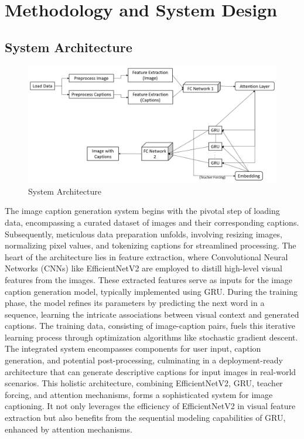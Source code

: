 \documentclass[oneside,a4paper,12pt]{report}
\begin{document}
\chapter{Methodology and System Design}


\section{System Architecture}  
\begin{figure}[H]
\begin{center}
\includegraphics[width=1.0\linewidth]{sysff}
\caption{System Architecture}
\label{Fig:f1}
\end{center}
\end{figure}
The image caption generation system begins with the pivotal step of loading data, encompassing a curated dataset of images and their corresponding captions. Subsequently, meticulous data preparation unfolds, involving resizing images, normalizing pixel values, and tokenizing captions for streamlined processing. The heart of the architecture lies in feature extraction, where Convolutional Neural Networks (CNNs) like EfficientNetV2 are employed to distill high-level visual features from the images. These extracted features serve as inputs for the image caption generation model, typically implemented using GRU. During the training phase, the model refines its parameters by predicting the next word in a sequence, learning the intricate associations between visual context and generated captions. The training data, consisting of image-caption pairs, fuels this iterative learning process through optimization algorithms like stochastic gradient descent. The integrated system encompasses components for user input, caption generation, and potential post-processing, culminating in a deployment-ready architecture that can generate descriptive captions for input images in real-world scenarios.
This holistic architecture, combining EfficientNetV2, GRU, teacher forcing, and attention mechanisms, forms a sophisticated system for image captioning. It not only leverages the efficiency of EfficientNetV2 in visual feature extraction but also benefits from the sequential modeling capabilities of GRU, enhanced by attention mechanisms. 
\end{document}

